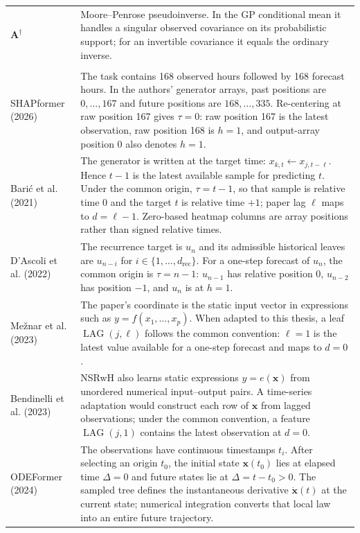 \begin{longtable}{@{}
>{\raggedright\arraybackslash}p{}
>{\raggedright\arraybackslash}p{}@{}}
$\mathbf A^\dagger$ &
Moore--Penrose pseudoinverse. In the GP conditional mean it handles a
singular observed covariance on its probabilistic support; for an invertible
covariance it equals the ordinary inverse. \\

\addlinespace
\multicolumn{2}{@{}l}{\textit{Time-origin convention in each reviewed paper}}\\
\addlinespace

SHAPformer (2026) &
The task contains 168 observed hours followed by 168 forecast hours. In the
authors' generator arrays, past positions are $0,\ldots,167$ and future
positions are $168,\ldots,335$. Re-centering at raw position 167 gives
$\tau=0$: raw position 167 is the latest observation, raw position 168 is
$h=1$, and output-array position 0 also denotes $h=1$. \\

Bari\'c et al. (2021) &
The generator is written at the target time:
$x_{k,t}\leftarrow x_{j,t-\ell}$. Hence $t-1$ is the latest available sample
for predicting $t$. Under the common origin, $\tau=t-1$, so that sample is
relative time 0 and the target $t$ is relative time $+1$; paper lag $\ell$
maps to $d=\ell-1$. Zero-based heatmap columns are array positions rather than
signed relative times. \\

D'Ascoli et al. (2022) &
The recurrence target is $u_n$ and its admissible historical leaves are
$u_{n-i}$ for $i\in\{1,\ldots,d_{\mathrm{rec}}\}$. For a one-step forecast of
$u_n$, the common origin is $\tau=n-1$: $u_{n-1}$ has relative position 0,
$u_{n-2}$ has position $-1$, and $u_n$ is at $h=1$. \\

Me\v{z}nar et al. (2023) &
The paper's coordinate is the static input vector in expressions such as
$y=f(x_1,\ldots,x_p)$. When adapted to this thesis, a leaf
$\operatorname{LAG}(j,\ell)$ follows the
common convention: $\ell=1$ is the latest value available for a one-step
forecast and maps to $d=0$. \\

Bendinelli et al. (2023) &
NSRwH also learns static expressions $y=e(\mathbf x)$ from unordered numerical
input--output pairs. A time-series adaptation would construct each row of
$\mathbf x$ from lagged observations; under the common convention, a feature
$\operatorname{LAG}(j,1)$ contains the latest observation at $d=0$. \\

ODEFormer (2024) &
The observations have continuous timestamps $t_i$. After selecting an origin
$t_0$, the initial state $\mathbf x(t_0)$ lies at elapsed time $\Delta=0$ and
future states lie at $\Delta=t-t_0>0$. The sampled tree defines the
instantaneous derivative $\dot{\mathbf x}(t)$ at the current state; numerical
integration converts that local law into an entire future trajectory. \\


\end{longtable}
